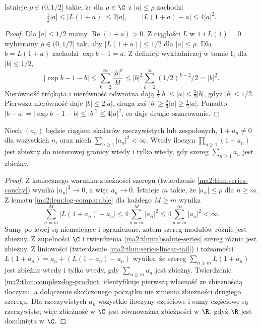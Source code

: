 \begin{lemat}
\label{ma2:lem:log-comparable}
Istnieje $\rho\in(0,1/2]$ takie, że dla $a\in\C$
z $|a|\le\rho$ zachodzi
\[
 \tfrac12|a|\le |L(1+a)|\le 2|a|,
 \qquad |L(1+a)-a|\le4|a|^2.
\]
\end{lemat}
\begin{proof}
Dla $|a|\le1/2$ mamy $\operatorname{Re}(1+a)>0$.
Z ciągłości $L$ w $1$ i $L(1)=0$ wybieramy
$\rho\in(0,1/2]$ tak, aby $|L(1+a)|\le1/2$ dla
$|a|\le\rho$. Dla $b=L(1+a)$ zachodzi
$\exp b-1=a$. Z definicji wykładniczej
w tomie I, dla $|b|\le1/2$,
\[
 |\exp b-1-b|
 \le\sum_{k=2}^\infty\frac{|b|^k}{k!}
 \le |b|^2\sum_{k=2}^\infty (1/2)^{k-2}/2
 =|b|^2.
\]
Nierówność trójkąta i nierówność odwrotna dają
$\tfrac12|b|\le|a|\le\tfrac32|b|$, gdyż $|b|\le1/2$.
Pierwsza nierówność daje $|b|\le2|a|$, druga zaś
$|b|\ge\tfrac23|a|\ge\tfrac12|a|$.
Ponadto $|b-a|=|\exp b-1-b|\le|b|^2\le4|a|^2$,
co daje drugie oszacowanie.
\end{proof}

\begin{wniosek}
\label{ma2:cor:product-square-summable}
Niech $(a_n)$ będzie ciągiem skalarów rzeczywistych lub
zespolonych, $1+a_n\ne0$ dla wszystkich $n$, oraz niech
$\sum_{n\ge1}|a_n|^2<\infty$.
Wtedy iloczyn $\prod_{n\ge1}(1+a_n)$ jest zbieżny
do niezerowej granicy wtedy i tylko wtedy, gdy
szereg $\sum_{n\ge1}a_n$ jest zbieżny.
\end{wniosek}
\begin{proof}
Z koniecznego warunku zbieżności szeregu
(twierdzenie \ref{ma2:thm:series-cauchy})
wynika $|a_n|^2\to0$, a więc $a_n\to0$.
Istnieje $m$ takie, że $|a_n|\le\rho$ dla $n\ge m$.
Z lematu \ref{ma2:lem:log-comparable} dla każdego
$M\ge m$ wynika
\[
 \sum_{n=m}^M |L(1+a_n)-a_n|
 \le4\sum_{n=m}^M |a_n|^2
 \le4\sum_{n=m}^\infty |a_n|^2<\infty.
\]
Sumy po lewej są niemalejące i ograniczone, zatem
szereg modułów różnic jest zbieżny. Z zupełności $\C$ i twierdzenia
\ref{ma2:thm:absolute-series} szereg różnic jest zbieżny.
Z liniowości (twierdzenie \ref{ma2:thm:series-linear-tail})
i tożsamości $L(1+a_n)=a_n+(L(1+a_n)-a_n)$ wynika,
że szereg $\sum_{n\ge m}L(1+a_n)$ jest zbieżny wtedy
i tylko wtedy, gdy $\sum_{n\ge m}a_n$ jest zbieżny. Twierdzenie \ref{ma2:thm:complex-log-product}
identyfikuje pierwszą własność ze zbieżnością iloczynu,
a dołączenie skończonego początku nie zmienia zbieżności
drugiego szeregu. Dla rzeczywistych $a_n$ wszystkie
iloczyny częściowe i sumy częściowe są rzeczywiste,
więc zbieżność w $\C$ jest równoważna zbieżności w $\R$,
gdyż $\R$ jest domknięta w $\C$.
\end{proof}

